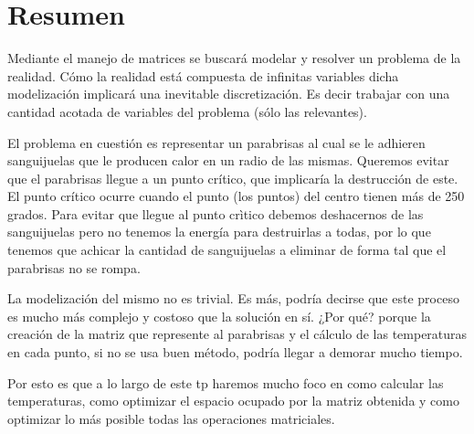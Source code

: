 \section{Resumen}

Mediante el manejo de matrices se buscará modelar y resolver un problema de la realidad. Cómo la realidad está compuesta de infinitas variables dicha modelización implicará una inevitable discretización. Es decir trabajar con una 
cantidad acotada de variables del problema (sólo las relevantes).

El problema en cuestión es representar un parabrisas al cual se le adhieren sanguijuelas que le producen calor en un radio de las mismas. Queremos evitar que el parabrisas llegue a un punto crítico, que implicaría la destrucción de este. El punto crítico ocurre cuando el punto (los puntos) del centro tienen más de 250 grados. Para evitar que llegue al punto crìtico debemos deshacernos de las sanguijuelas pero no tenemos la energía para destruirlas a todas, por lo que tenemos que achicar la cantidad de sanguijuelas a eliminar de forma tal que el parabrisas no se rompa.

La modelización del mismo no es trivial. Es más, podría decirse que este proceso es mucho más complejo y costoso que la solución en sí. ¿Por qué? porque la creación de la matriz que represente al parabrisas y el cálculo de las temperaturas en cada punto, si no se usa buen método, podría llegar a demorar mucho tiempo.

Por esto es que a lo largo de este tp haremos mucho foco en como calcular las temperaturas, como optimizar el espacio ocupado por la matriz obtenida y como optimizar lo más posible todas las operaciones matriciales.


